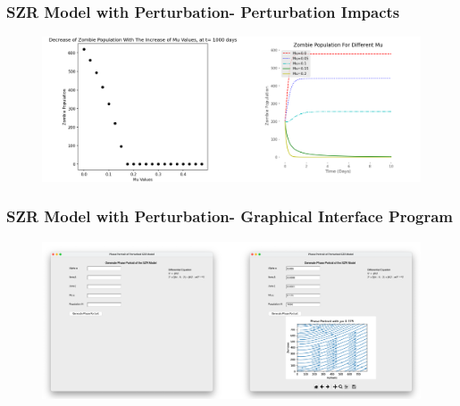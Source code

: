 \documentclass{beamer}
\begin{document}
\begin{frame}
\begin{adjustwidth}{-1.5em}{-1.5em}
\frametitle{SZR Model with Perturbation- Perturbation Impacts}

\begin{figure}[H]
\centering
\includegraphics[scale=0.37]{SZR_3.png}
\label{fig:SZR Model 02}
\end{figure}
\end{adjustwidth}
\end{frame}



\begin{frame}
\frametitle{SZR Model with Perturbation- Graphical Interface Program}

\begin{figure}[H]
\centering
\includegraphics[scale=0.075]{SZR_2.png}
\label{fig:SZR Model 03}
\end{figure}
\end{frame}
\end{document}
